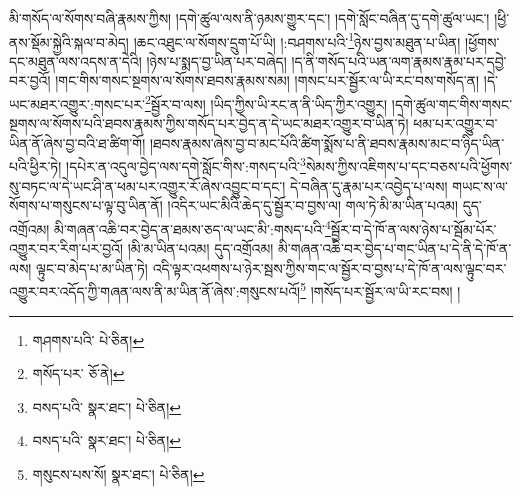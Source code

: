 མི་གསོད་ལ་སོགས་བཞི་རྣམས་ཀྱིས། །དགེ་ཚུལ་ལས་ནི་ཉམས་གྱུར་དང་། །དགེ་སློང་བཞིན་དུ་དགེ་ཚུལ་ཡང་། །ཕྱི་ནས་སྡོམ་སྐྱེའི་སྐལ་བ་མེད། །ཆང་འཐུང་ལ་སོགས་དྲུག་པོ་ཡི། །:བཤགས་པའི་\footnote{གཤགས་པའི་  པེ་ཅིན། }ཉེས་བྱས་མཐུན་པ་ཡིན། །ཕྱོགས་དང་མཐུན་ལས་འདས་ན་དེའི། །ཉེས་པ་སྨད་བྱ་ཡིན་པར་བཞེད། །ད་ནི་གསོད་པའི་ཡན་ལག་རྣམས་རྣམ་པར་དབྱེ་བར་བྱའོ། །གང་གིས་གསང་སྔགས་ལ་སོགས་ཐབས་རྣམས་སམ། །གསང་པར་སྦྱོར་ལ་ཡི་རང་བས་གསོད་ན། །དེ་ཡང་མཐར་འགྱུར་:གསང་པར་\footnote{གསོད་པར་  ཅོ་ནེ། }སྦྱོར་བ་ལས། །ཡིད་ཀྱིས་ཡི་རང་ན་ནི་ཡིད་ཀྱིར་འགྱུར། །དགེ་ཚུལ་གང་གིས་གསང་སྔགས་ལ་སོགས་པའི་ཐབས་རྣམས་ཀྱིས་གསོད་པར་བྱེད་ན་དེ་ཡང་མཐར་འགྱུར་བ་ཡིན་ཏེ། ཕམ་པར་འགྱུར་བ་ཡིན་ནོ་ཞེས་བྱ་བའི་ཐ་ཚིག་གོ། །ཐབས་རྣམས་ཞེས་བྱ་བ་མང་པོའི་ཚིག་སྨོས་པ་ནི་ཐབས་རྣམས་མང་བ་ཉིད་ཡིན་པའི་ཕྱིར་ཏེ། །དཔེར་ན་འདུལ་བྱེད་ལས་དགེ་སློང་གིས་:གསད་པའི་\footnote{བསད་པའི་  སྣར་ཐང་།  པེ་ཅིན། }སེམས་ཀྱིས་འཇིགས་པ་དང་བཅས་པའི་ཕྱོགས་སུ་བཏང་ལ་དེ་ཡང་ཤི་ན་ཕམ་པར་འགྱུར་རོ་ཞེས་འབྱུང་བ་དང་། དེ་བཞིན་དུ་རྣམ་པར་འབྱེད་པ་ལས། གཡང་ས་ལ་སོགས་པ་གསུངས་པ་ལྟ་བུ་ཡིན་ནོ། །འདིར་ཡང་མིའི་ཆེད་དུ་སྦྱོར་བ་བྱས་ལ། གལ་ཏེ་མི་མ་ཡིན་པའམ། དུད་འགྲོའམ། མི་གཞན་འཆི་བར་བྱེད་ན་ཐམས་ཅད་ལ་ཡང་མི་:གསད་པའི་\footnote{བསད་པའི་  སྣར་ཐང་།  པེ་ཅིན། }སྦྱོར་བ་དེ་ཁོ་ན་ལས་ཉེས་པ་སྦོམ་པོར་འགྱུར་བར་རིག་པར་བྱའོ། །མི་མ་ཡིན་པའམ། དུད་འགྲོའམ། མི་གཞན་འཆི་བར་བྱེད་པ་གང་ཡིན་པ་དེ་ནི་དེ་ཁོ་ན་ལས། ལྟུང་བ་མེད་པ་མ་ཡིན་ཏེ། འདི་ལྟར་འཕགས་པ་ཉེར་སྦས་ཀྱིས་གང་ལ་སྦྱོར་བ་བྱས་པ་དེ་ཁོ་ན་ལས་ལྟུང་བར་འགྱུར་བར་འདོད་ཀྱི་གཞན་ལས་ནི་མ་ཡིན་ནོ་ཞེས་:གསུངས་པའོ།\footnote{གསུངས་པས་སོ།  སྣར་ཐང་།  པེ་ཅིན། } །གསོད་པར་སྦྱོར་ལ་ཡི་རང་བས། །
